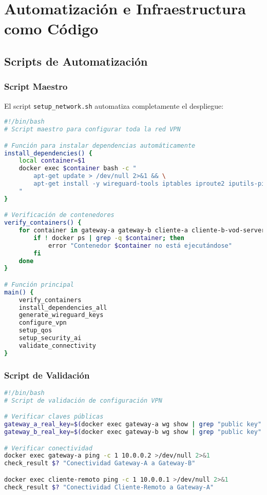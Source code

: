 \section{Automatización e Infraestructura como Código}

\subsection{Scripts de Automatización}

\subsubsection{Script Maestro}

El script \texttt{setup\_network.sh} automatiza completamente el despliegue:

\begin{lstlisting}[language=bash, caption=Funciones principales del script maestro]
#!/bin/bash
# Script maestro para configurar toda la red VPN

# Función para instalar dependencias automáticamente
install_dependencies() {
    local container=$1
    docker exec $container bash -c "
        apt-get update > /dev/null 2>&1 && \
        apt-get install -y wireguard-tools iptables iproute2 iputils-ping > /dev/null 2>&1
    "
}

# Verificación de contenedores
verify_containers() {
    for container in gateway-a gateway-b cliente-a cliente-b-vod-server cliente-remoto; do
        if ! docker ps | grep -q $container; then
            error "Contenedor $container no está ejecutándose"
        fi
    done
}

# Función principal
main() {
    verify_containers
    install_dependencies_all
    generate_wireguard_keys
    configure_vpn
    setup_qos
    setup_security_ai
    validate_connectivity
}
\end{lstlisting}

\subsubsection{Script de Validación}

\begin{lstlisting}[language=bash, caption=Validación automática de configuración]
#!/bin/bash
# Script de validación de configuración VPN

# Verificar claves públicas
gateway_a_real_key=$(docker exec gateway-a wg show | grep "public key" | awk '{print $3}')
gateway_b_real_key=$(docker exec gateway-b wg show | grep "public key" | awk '{print $3}')

# Verificar conectividad
docker exec gateway-a ping -c 1 10.0.0.2 >/dev/null 2>&1
check_result $? "Conectividad Gateway-A a Gateway-B"

docker exec cliente-remoto ping -c 1 10.0.0.1 >/dev/null 2>&1
check_result $? "Conectividad Cliente-Remoto a Gateway-A"
\end{lstlisting}

